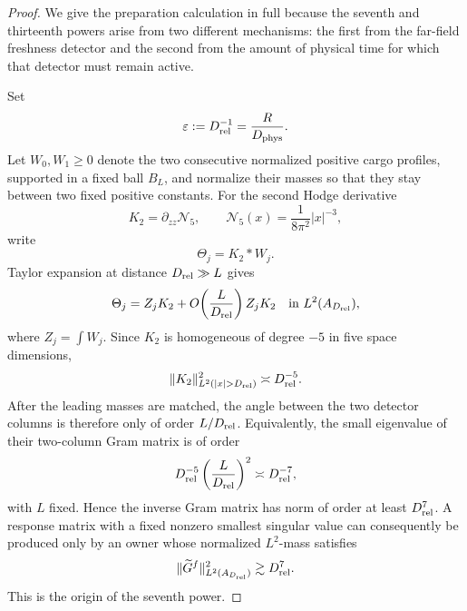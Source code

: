 \documentclass[11pt]{article}
\theoremstyle{definition}\newtheorem{definition}[theorem]{Definition}
\theoremstyle{remark}\newtheorem{remark}[theorem]{Remark}
\begin{document}
\begin{proof}
We give the preparation calculation in full because the seventh and thirteenth
powers arise from two different mechanisms: the first from the far-field
freshness detector and the second from the amount of physical time for which
that detector must remain active.

Set
\[
 \varepsilon:=D_{\rm rel}^{-1}=\frac{R}{D_{\rm phys}}.
\]
Let $W_0,W_1\ge0$ denote the two consecutive normalized positive cargo profiles,
supported in a fixed ball $B_L$, and normalize their masses so that they stay
between two fixed positive constants.  For the second Hodge derivative
\[
 K_2=\partial_{zz}\mathcal N_5,
 \qquad \mathcal N_5(x)=\frac1{8\pi^2}|x|^{-3},
\]
write
\[
 \Theta_j=K_2*W_j.
\]
Taylor expansion at distance $D_{\rm rel}\gg L$ gives
\[
 \Theta_j=Z_jK_2+O\!\left(\frac{L}{D_{\rm rel}}\right)Z_jK_2
 \quad\hbox{in }L^2(A_{D_{\rm rel}}),
\]
where $Z_j=\int W_j$.  Since $K_2$ is homogeneous of degree $-5$ in five
space dimensions,
\[
 \|K_2\|_{L^2(|x|>D_{\rm rel})}^2\asymp D_{\rm rel}^{-5}.
\]
After the leading masses are matched, the angle between the two detector
columns is therefore only of order $L/D_{\rm rel}$.  Equivalently, the small
eigenvalue of their two-column Gram matrix is of order
\[
 D_{\rm rel}^{-5}
 \left(\frac{L}{D_{\rm rel}}\right)^2
 \asymp D_{\rm rel}^{-7},
\]
with $L$ fixed.  Hence the inverse Gram matrix has norm of order at least
$D_{\rm rel}^{7}$.  A response matrix with a fixed nonzero smallest singular
value can consequently be produced only by an owner whose normalized
$L^2$-mass satisfies
\[
 \|\widetilde G^f\|_{L^2(A_{D_{\rm rel}})}^2
 \gtrsim D_{\rm rel}^{7}.
\]
This is the origin of the seventh power.


\end{proof}
\end{document}
